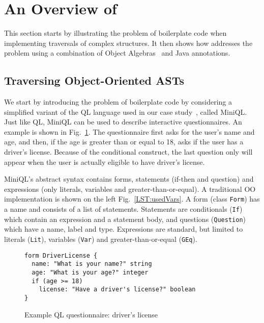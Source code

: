 \section{An Overview of \name}\label{subsec:overview}

This section starts by illustrating the problem of boilerplate code when implementing
traversals of complex structures. It then shows how \name addresses
the problem using a combination of Object Algebras~\cite{bruno12oa}
and Java annotations.

\subsection{Traversing Object-Oriented ASTs  }



We start by introducing the problem of boilerplate code by considering
a simplified variant of the QL language used in our case
study~\cite{gouseti14extensible}, called MiniQL.  Just like QL, MiniQL
can be used to describe interactive questionnaires. An example is
shown in Fig.~\ref{driver_license}.  The questionnaire first asks
for the user's name and age, and then, if the age is greater than or
equal to 18, asks if the user has a driver's license.  Because of the
conditional construct, the last question only will appear when the
user is actually eligible to have driver's license.

MiniQL's abstract syntax contains forms, statements (if-then and question) and expressions (only literals, variables and greater-than-or-equal).
A traditional OO implementation is shown on the left Fig.~\ref{LST:usedVars}.
A form (class \lstinline{Form}) has a name and consists of a list of statements.
Statements are conditionals (\lstinline{If}) which contain an expression and a statement body, and questions (\lstinline{Question}) which have a name, label and type. Expressions are standard, but limited to literals (\lstinline{Lit}), variables (\lstinline{Var}) and greater-than-or-equal (\lstinline{GEq}).

\begin{figure}[t]
\nocaptionrule
\begin{lstlisting}[language=ql]
form DriverLicense {
  name: "What is your name?" string
  age: "What is your age?" integer
  if (age >= 18)
    license: "Have a driver's license?" boolean
}
\end{lstlisting}
\caption{Example QL questionnaire: driver's license}
\label{driver_license}
\end{figure}

